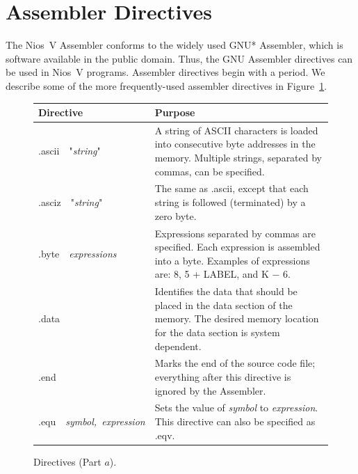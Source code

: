 \documentclass[11pt, twoside, pdftex]{article}
\begin{document}
\section{Assembler Directives}

The Nios~V Assembler conforms to the widely used GNU* Assembler, which is 
software available in the public domain. Thus, the GNU Assembler directives can
be used in Nios~V programs. Assembler directives begin with a period. 
We describe some of the more frequently-used assembler directives in
Figure~\ref{fig:directives}.

\begin{figure}[H]
\begin{center}
\begin{tabular}{p{.22\linewidth}|p{.7\linewidth}}
{\bf Directive} & {\bf Purpose} \\ \hline
\rule[-0.075in]{0in}{0.25in}{\sf .ascii}~~"{\it string}" & A string of ASCII characters is 
loaded into consecutive byte addresses in the memory.  Multiple strings, separated by commas, 
can be specified.\\
\rule[-0.075in]{0in}{0.33in}{\sf .asciz}~~"{\it string}" & The same as {\sf .ascii}, except 
that each string is followed (terminated) by a zero byte.\\
\rule[-0.075in]{0in}{0.33in}{\sf .byte}~~{\it expressions} & 
Expressions separated by commas are specified. Each expression is assembled into
a byte. Examples of expressions are: 8, 5 + LABEL, and K $-$ 6.\\
\rule[-0.075in]{0in}{0.33in}{\sf .data} & Identifies the data that should be placed in the 
data section of the memory. The desired memory location for the data section is system dependent.\\
\rule[-0.075in]{0in}{0.33in}{\sf .end} & 
Marks the end of the source code file; everything after this
directive is ignored by the Assembler.\\
\rule[-0.075in]{0in}{0.33in}{\sf .equ}~~{\it symbol,~expression} &
Sets the value of {\it symbol} to {\it expression}. This directive can also be specified
as {\sf .eqv}.\\
\end{tabular}
\end{center}
	\caption{Directives (Part $a$).}
	\label{fig:directives}
\end{figure}
\end{document}
